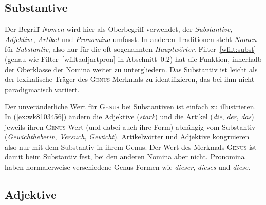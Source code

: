 \subsection{Substantive}

\label{sec:substantivewortklassen}

Der Begriff \textit{Nomen} wird hier als Oberbegriff verwendet, der \textit{Substantive}, \textit{Adjektive}, \textit{Artikel} und \textit{Pronomina} umfasst.
In anderen Traditionen steht \textit{Nomen} für \textit{Substantiv}, also nur für die oft sogenannten \textit{Hauptwörter}.
Filter~\ref{wfilt:subst} (genau wie Filter~\ref{wfilt:adjartpron} in Abschnitt~\ref{sec:adjektivewortklassen}) hat die Funktion, innerhalb der Oberklasse der Nomina weiter zu untergliedern.
Das Substantiv ist leicht als der lexikalische Träger des \textsc{Genus}-Merkmals zu identifizieren, das bei ihm nicht paradigmatisch variiert.


Der unveränderliche Wert für \textsc{Genus} bei Substantiven ist einfach zu illustrieren.
In (\ref{ex:wk8103456}) ändern die Adjektive (\textit{stark}) und die Artikel (\textit{die}, \textit{der}, \textit{das}) jeweils ihren \textsc{Genus}-Wert (und dabei auch ihre Form) abhängig vom Substantiv (\textit{Gewichtheberin}, \textit{Versuch}, \textit{Gewicht}).
Artikelwörter und Adjektive kongruieren also nur mit dem Substantiv in ihrem Genus.
Der Wert des Merkmals \textsc{Genus} ist damit beim Substantiv fest, bei den anderen Nomina aber nicht.
Pronomina haben normalerweise verschiedene Genus-Formen wie \textit{dieser}, \textit{dieses} und \textit{diese}.

\begin{exe}
  \ex\label{ex:wk8103456}
  \begin{xlist}
  \end{xlist}
\end{exe}

\subsection{Adjektive}

\label{sec:adjektivewortklassen}

